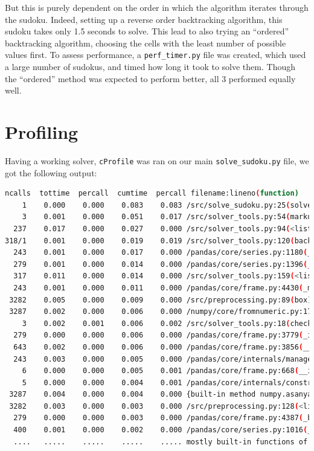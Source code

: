 \documentclass[12pt]{report} %
\begin{document}
But this is purely dependent on the order in which the algorithm iterates through the sudoku. Indeed, setting up a reverse order backtracking algorithm, this sudoku takes only 1.5 seconds to solve. This lead to also trying an ``ordered'' backtracking algorithm, choosing the cells with the least number of possible values first\cite{stackoverflow_optimizing_backtracking_sudoku}. To assess performance, a \texttt{perf\_timer.py} file was created, which used a large number of sudokus\cite{kaggle_sudoku_dataset}, and timed how long it took to solve them. Though the ``ordered'' method was expected to perform better, all 3 performed equally well.

\section{Profiling}


Having a working solver, \texttt{cProfile} was ran on our main \texttt{solve\_sudoku.py} file, we got the following output:


\begin{lstlisting}[language=Bash,caption={First profiling output, the right side describing what is running has been shortened for easier reading}, basicstyle=\tiny]
ncalls  tottime  percall  cumtime  percall filename:lineno(function)
    1    0.000    0.000    0.083    0.083 /src/solve_sudoku.py:25(solve_sudoku
    3    0.001    0.000    0.051    0.017 /src/solver_tools.py:54(markup)
  237    0.017    0.000    0.027    0.000 /src/solver_tools.py:94(<listcomp>)
318/1    0.001    0.000    0.019    0.019 /src/solver_tools.py:120(backtrack_alg)
  243    0.001    0.000    0.017    0.000 /pandas/core/series.py:1180(__setitem__)
  279    0.001    0.000    0.014    0.000 /pandas/core/series.py:1396(_maybe_update_cacher)
  317    0.011    0.000    0.014    0.000 /src/solver_tools.py:159(<listcomp>)
  243    0.001    0.000    0.011    0.000 /pandas/core/frame.py:4430(_maybe_cache_changed)
 3282    0.005    0.000    0.009    0.000 /src/preprocessing.py:89(box)
 3287    0.002    0.000    0.006    0.000 /numpy/core/fromnumeric.py:1768(ravel)
    3    0.002    0.001    0.006    0.002 /src/solver_tools.py:18(check_sudoku)
  279    0.000    0.000    0.006    0.000 /pandas/core/frame.py:3779(_ixs)
  643    0.002    0.000    0.006    0.000 /pandas/core/frame.py:3856(__getitem__)
  243    0.003    0.000    0.005    0.000 /pandas/core/internals/managers.py:1045(iset)
    6    0.000    0.000    0.005    0.001 /pandas/core/frame.py:668(__init__)
    5    0.000    0.000    0.004    0.001 /pandas/core/internals/construction.py:423(dict_to_mgr)
 3287    0.004    0.000    0.004    0.000 {built-in method numpy.asanyarray}
 3282    0.003    0.000    0.003    0.000 /src/preprocessing.py:128(<listcomp>)
  279    0.000    0.000    0.003    0.000 /pandas/core/frame.py:4387(_box_col_values)
  400    0.001    0.000    0.002    0.000 /pandas/core/series.py:1016(__getitem__)
  ....   .....    .....    .....    ..... mostly built-in functions of packages
\end{lstlisting}
\end{document}
